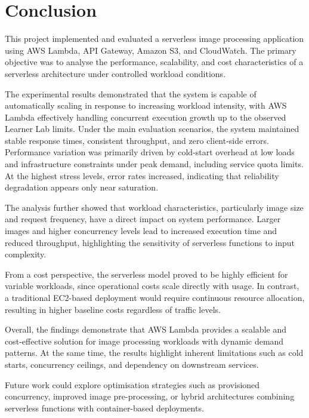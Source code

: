 \documentclass[11pt,a4paper,twocolumn]{article}
\begin{document}
\section{Conclusion}

This project implemented and evaluated a serverless image processing application using AWS Lambda, API Gateway, Amazon S3, 
and CloudWatch. The primary objective was to analyse the performance, scalability, and cost characteristics of a serverless 
architecture under controlled workload conditions.

The experimental results demonstrated that the system is capable of automatically scaling in response to increasing workload intensity, with AWS Lambda effectively handling concurrent execution growth up to the observed Learner Lab limits. Under the main evaluation scenarios, the system maintained stable response times, consistent throughput, and zero client-side errors. Performance variation was primarily driven by cold-start overhead at low loads and infrastructure constraints under peak demand, including service quota limits. At the highest stress levels, error rates increased, indicating that reliability degradation appears only near saturation.

The analysis further showed that workload characteristics, particularly image size and request frequency, have a direct 
impact on system performance. Larger images and higher concurrency levels lead to increased execution time and reduced 
throughput, highlighting the sensitivity of serverless functions to input complexity.

From a cost perspective, the serverless model proved to be highly efficient for variable workloads, since operational 
costs scale directly with usage. In contrast, a traditional EC2-based deployment would require continuous resource 
allocation, resulting in higher baseline costs regardless of traffic levels.

Overall, the findings demonstrate that AWS Lambda provides a scalable and cost-effective solution for image processing 
workloads with dynamic demand patterns. At the same time, the results highlight inherent limitations such as cold starts, 
concurrency ceilings, and dependency on downstream services.

Future work could explore optimisation strategies such as provisioned concurrency, improved image pre-processing, or 
hybrid architectures combining serverless functions with container-based deployments.




\end{document}
